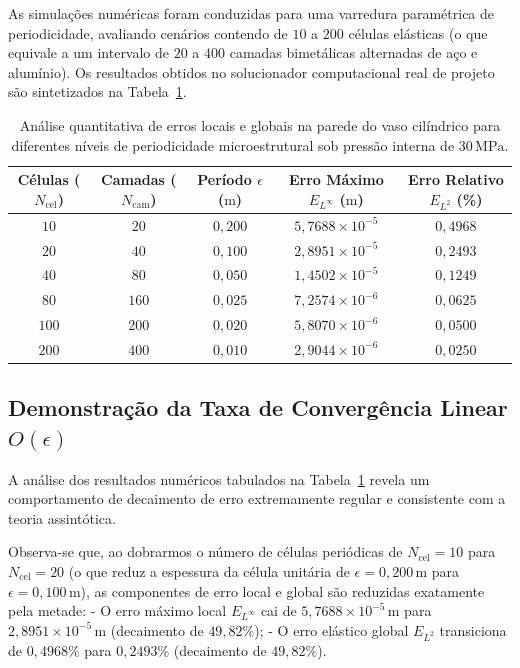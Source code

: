 As simulações numéricas foram conduzidas para uma varredura paramétrica de periodicidade, avaliando cenários contendo de $10$ a $200$ células elásticas (o que equivale a um intervalo de $20$ a $400$ camadas bimetálicas alternadas de aço e alumínio). Os resultados obtidos no solucionador computacional real de projeto são sintetizados na Tabela~\ref{tab:convergencia_erros}.

\begin{table}[htbp]
  \centering
  \caption{Análise quantitativa de erros locais e globais na parede do vaso cilíndrico para diferentes níveis de periodicidade microestrutural sob pressão interna de $30 \, \text{MPa}$.}
  \label{tab:convergencia_erros}
  \begin{tabular}{|c|c|c|c|c|}
    \hline
    \textbf{Células ($N_{\text{cel}}$)} & \textbf{Camadas ($N_{\text{cam}}$)} & \textbf{Período $\epsilon$ ($\text{m}$)} & \textbf{Erro Máximo $E_{L^\infty}$ ($\text{m}$)} & \textbf{Erro Relativo $E_{L^2}$ (\%)} \\ \hline
    $10$ & $20$ & $0,200$ & $5,7688 \times 10^{-5}$ & $0,4968$ \\ \hline
    $20$ & $40$ & $0,100$ & $2,8951 \times 10^{-5}$ & $0,2493$ \\ \hline
    $40$ & $80$ & $0,050$ & $1,4502 \times 10^{-5}$ & $0,1249$ \\ \hline
    $80$ & $160$ & $0,025$ & $7,2574 \times 10^{-6}$ & $0,0625$ \\ \hline
    $100$ & $200$ & $0,020$ & $5,8070 \times 10^{-6}$ & $0,0500$ \\ \hline
    $200$ & $400$ & $0,010$ & $2,9044 \times 10^{-6}$ & $0,0250$ \\ \hline
  \end{tabular}
\end{table}

\subsection{Demonstração da Taxa de Convergência Linear $O(\epsilon)$}

A análise dos resultados numéricos tabulados na Tabela~\ref{tab:convergencia_erros} revela um comportamento de decaimento de erro extremamente regular e consistente com a teoria assintótica.

Observa-se que, ao dobrarmos o número de células periódicas de $N_{\text{cel}} = 10$ para $N_{\text{cel}} = 20$ (o que reduz a espessura da célula unitária de $\epsilon = 0,200 \, \text{m}$ para $\epsilon = 0,100 \, \text{m}$), as componentes de erro local e global são reduzidas exatamente pela metade:
- O erro máximo local $E_{L^\infty}$ cai de $5,7688 \times 10^{-5} \, \text{m}$ para $2,8951 \times 10^{-5} \, \text{m}$ (decaimento de $49,82\%$);
- O erro elástico global $E_{L^2}$ transiciona de $0,4968\%$ para $0,2493\%$ (decaimento de $49,82\%$).

